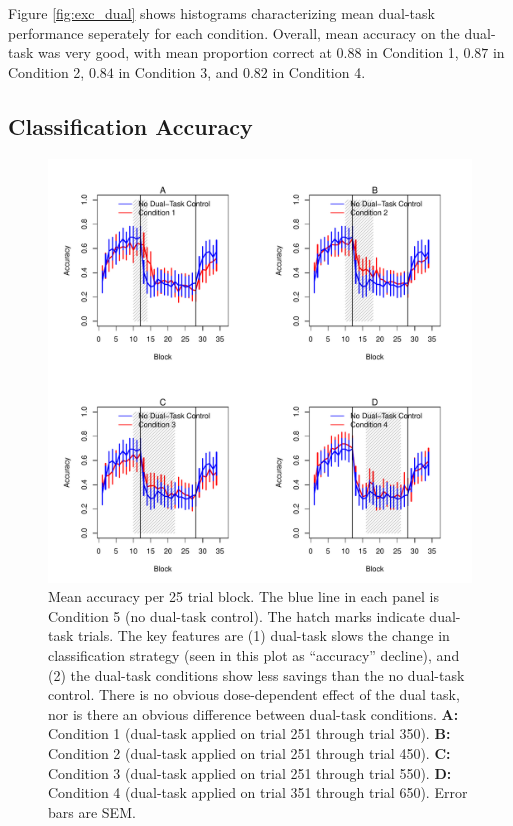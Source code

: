 \documentclass[man,apacite,draftfirst]{apa6}
\begin{document}
Figure \ref{fig:exc_dual} shows histograms characterizing mean dual-task
performance seperately for each condition. Overall, mean accuracy on the
dual-task was very good, with mean proportion correct at $0.88$ in Condition 1,
$0.87$ in Condition 2, $0.84$ in Condition 3, and $0.82$ in Condition 4.

\subsection*{Classification Accuracy} 
\begin{figure}[t]
  \centering \includegraphics[width=1.0\textwidth]{../figures/fig_learning_curves.pdf}
  \caption{
    Mean accuracy per 25 trial block. The blue line in each panel is Condition
    5 (no dual-task control). The hatch marks indicate dual-task trials. The key
    features are (1) dual-task slows the change in classification strategy (seen
    in this plot as ``accuracy'' decline), and (2) the dual-task conditions show
    less savings than the no dual-task control. There is no obvious 
    dose-dependent effect of the dual task, nor is there an obvious difference
    between dual-task conditions.
    \textbf{A:} Condition 1 (dual-task applied on trial 251 through trial 350).
    \textbf{B:} Condition 2 (dual-task applied on trial 251 through trial 450). 
    \textbf{C:} Condition 3 (dual-task applied on trial 251 through trial 550). 
    \textbf{D:} Condition 4 (dual-task applied on trial 351 through trial 650). 
    Error bars are SEM.
  }
  \label{fig:learning_curves}
\end{figure}
\end{document}

